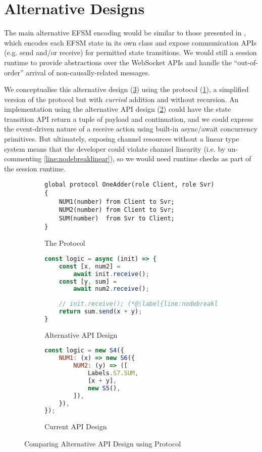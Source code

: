 \section{Alternative Designs}
\label{section:nodealt}

The main alternative EFSM encoding would be similar to those
presented in \cite{Hybrid2016}, which encodes
each EFSM state in its own class 
and expose communication APIs (e.g. send and/or receive) 
for permitted state transitions.
We would still a session runtime to provide
abstractions over the WebSocket APIs and handle the 
``out-of-order'' arrival of non-causally-related messages.

We conceptualise this alternative design (\cref{fig:nodealt})
using the  protocol (\cref{subfig:oneadder}), 
a simplified version of the  protocol 
but with \textit{curried} addition and without recursion.
An implementation using the alternative API design
(\cref{subfig:oneadderalt}) could have the state transition 
API return a tuple of payload and continuation,
and we could express the event-driven nature of a receive action
using built-in async/await concurrency primitives.
But ultimately, exposing channel resources without a linear type system
means that the developer could violate channel linearity
(i.e. by un-commenting \cref{line:nodebreaklinear}), 
so we would need runtime checks as part of the session runtime.

\begin{figure}[!h]
\centering
\begin{subfigure}{\textwidth}
\begin{lstlisting}[language=scribble]
global protocol OneAdder(role Client, role Svr) {
	NUM1(number) from Client to Svr;
	NUM2(number) from Client to Svr;
	SUM(number)  from Svr to Client;
}
\end{lstlisting}
\caption{The  Protocol}
\label{subfig:oneadder}
\end{subfigure}
\begin{subfigure}{0.49\textwidth}
\begin{lstlisting}[language=javascript,tabsize=2]
const logic = async (init) => {
	const [x, num2] = 
		await init.receive();
 	const [y, sum] = 
 		await num2.receive();
 		
 	// init.receive(); (*@\label{line:nodebreaklinear}@*)
	return sum.send(x + y);
}
\end{lstlisting}
\caption{Alternative API Design}
\label{subfig:oneadderalt}
\end{subfigure}
\hfill
\begin{subfigure}{0.49\textwidth}
\begin{lstlisting}[language=javascript,tabsize=2]
const logic = new S4({
	NUM1: (x) => new S6({
		NUM2: (y) => ([
			Labels.S7.SUM,
			[x + y],
			new S5(),
		]),
	}),
});
\end{lstlisting}
\caption{Current API Design}
\end{subfigure}
\caption{Comparing Alternative  
API Design using  Protocol}
\label{fig:nodealt}
\end{figure}

